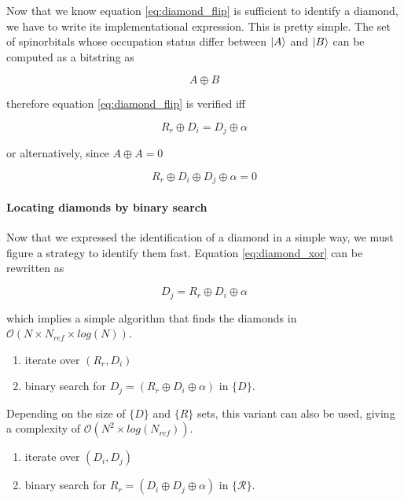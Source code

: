 \documentclass[./thesis.tex]{subfiles}
\begin{document}
Now that we know equation \ref{eq:diamond_flip} is sufficient to identify a diamond, we have to write its implementational expression. This is pretty simple. The set of spinorbitals whose occupation status differ between $\ket A$ and $\ket B$ can be computed as a bitstring as

\begin{equation}
A \oplus B
\end{equation}

therefore equation \ref{eq:diamond_flip} is verified iff

\begin{equation}
R_r \oplus D_i = D_j \oplus \alpha
\end{equation}

or alternatively, since $A \oplus A = 0$

\begin{equation}
R_r \oplus D_i \oplus D_j \oplus \alpha = 0
\label{eq:diamond_xor}
\end{equation}

\paragraph{Locating diamonds by binary search}
Now that we expressed the identification of a diamond in a simple way, we must figure a strategy to identify them fast. Equation \ref{eq:diamond_xor} can be rewritten as

\begin{equation}
D_j = R_r \oplus D_i \oplus \alpha
\end{equation}

which implies a simple algorithm that finds the diamonds in $\mathcal{O}(N \times N_{ref} \times log(N))$.
\begin{enumerate}
\item
iterate over $(R_r, D_i)$
\item
binary search for $D_j = (R_r \oplus D_i \oplus \alpha)$ in $\{D\}$. 
\end{enumerate}

Depending on the size of $\{D\}$ and $\{R\}$ sets, this variant can also be used, giving a complexity of $\mathcal{O}(N^2 \times log(N_{ref}))$.

\begin{enumerate}
\item
iterate over $(D_i, D_j)$
\item
binary search for $R_r = (D_i \oplus D_j \oplus \alpha)$ in $\{\mathcal{R}\}$. 
\end{enumerate}
\end{document}
